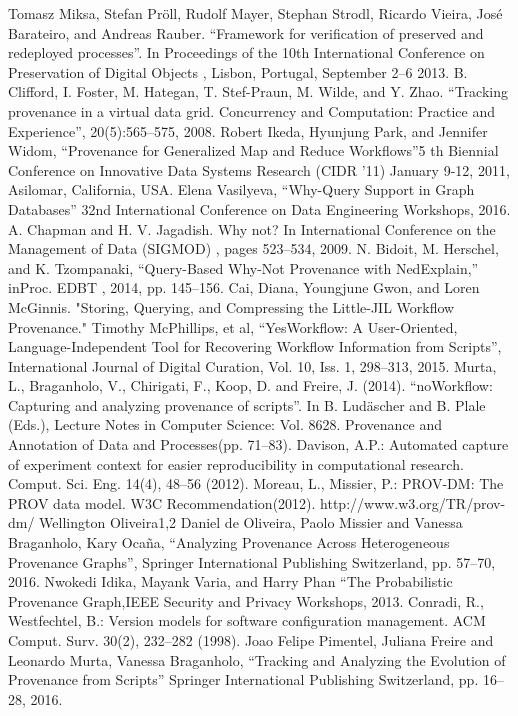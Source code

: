 \documentclass[6pt,,a4paper]{article}
\begin{document}
\begin{thebibliography}{12}
 Tomasz Miksa, Stefan Pröll, Rudolf Mayer, Stephan Strodl, Ricardo Vieira, José Barateiro, and Andreas Rauber. “Framework for verification of preserved and redeployed processes”. In Proceedings of the 10th International Conference on Preservation of Digital Objects , Lisbon, Portugal, September 2–6 2013.
 B. Clifford, I. Foster, M. Hategan, T. Stef-Praun, M. Wilde, and Y. Zhao. “Tracking provenance in a virtual data grid. Concurrency and Computation: Practice and Experience”, 20(5):565–575, 2008.
 Robert Ikeda, Hyunjung Park, and Jennifer Widom, “Provenance for Generalized Map and Reduce Workflows”5 th Biennial Conference on Innovative Data Systems Research (CIDR ’11) January 9-12, 2011, Asilomar, California, USA.
 Elena Vasilyeva, “Why-Query Support in Graph Databases” 32nd International Conference on Data Engineering Workshops, 2016.
 A. Chapman and H. V. Jagadish. Why not? In International Conference on the Management of Data (SIGMOD) , pages 523–534, 2009.
 N. Bidoit, M. Herschel, and K. Tzompanaki, “Query-Based Why-Not Provenance with NedExplain,” inProc. EDBT , 2014, pp. 145–156.
 Cai, Diana, Youngjune Gwon, and Loren McGinnis. "Storing, Querying, and Compressing the Little-JIL Workflow Provenance."
 Timothy McPhillips, et al, “YesWorkflow: A User-Oriented, Language-Independent Tool for Recovering Workflow Information from Scripts”, International Journal of Digital Curation,  Vol. 10, Iss. 1, 298–313, 2015.
 Murta, L., Braganholo, V., Chirigati, F., Koop, D. and  Freire, J. (2014). “noWorkflow: Capturing and analyzing provenance of scripts”. In B. Ludäscher and  B. Plale (Eds.), Lecture Notes in Computer Science: Vol. 8628. Provenance and Annotation of Data and Processes(pp. 71–83).
 Davison, A.P.: Automated capture of experiment context for easier reproducibility in computational research. Comput. Sci. Eng. 14(4), 48–56 (2012).
 Moreau, L., Missier, P.: PROV-DM: The PROV data model. W3C Recommendation(2012). http://www.w3.org/TR/prov-dm/
 Wellington Oliveira1,2 Daniel de Oliveira, Paolo Missier and Vanessa Braganholo, Kary Ocaña, “Analyzing Provenance Across Heterogeneous Provenance Graphs”, Springer International Publishing Switzerland, pp. 57–70, 2016. 
 Nwokedi Idika, Mayank Varia, and Harry Phan “The Probabilistic Provenance Graph,IEEE Security and Privacy Workshops, 2013.
 Conradi, R., Westfechtel, B.: Version models for software configuration management. ACM Comput. Surv. 30(2), 232–282 (1998).
 Joao Felipe Pimentel, Juliana Freire and Leonardo Murta, Vanessa Braganholo, “Tracking and Analyzing the Evolution of Provenance from Scripts” Springer International Publishing Switzerland, pp. 16–28, 2016.
\end{thebibliography}
\end{document}
